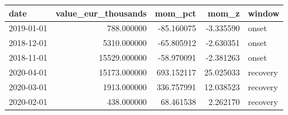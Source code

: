 \begin{tabular}{lrrrl}
\toprule
date & value_eur_thousands & mom_pct & mom_z & window \\
\midrule
2019-01-01 & 788.000000 & -85.160075 & -3.335590 & onset \\
2018-12-01 & 5310.000000 & -65.805912 & -2.630351 & onset \\
2018-11-01 & 15529.000000 & -58.970091 & -2.381263 & onset \\
2020-04-01 & 15173.000000 & 693.152117 & 25.025033 & recovery \\
2020-03-01 & 1913.000000 & 336.757991 & 12.038523 & recovery \\
2020-02-01 & 438.000000 & 68.461538 & 2.262170 & recovery \\
\bottomrule
\end{tabular}
